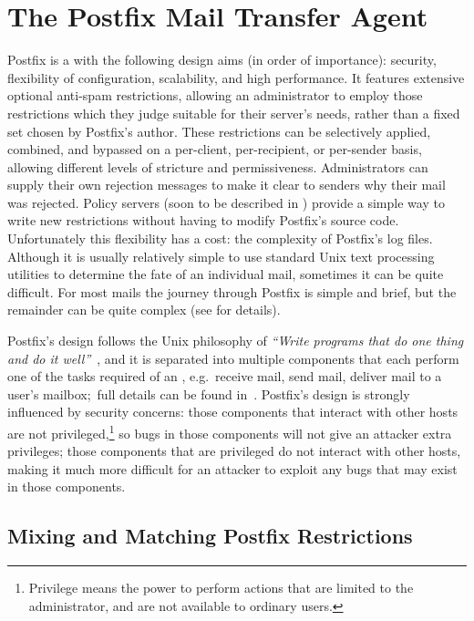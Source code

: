 \section{The Postfix Mail Transfer Agent}

\label{postfix background}

Postfix is a  with the following design aims (in order of
importance): security, flexibility of configuration, scalability, and high
performance.  It features extensive optional anti-spam restrictions,
allowing an administrator to employ those restrictions which they judge
suitable for their server's needs, rather than a fixed set chosen by
Postfix's author.  These restrictions can be selectively applied, combined,
and bypassed on a per-client, per-recipient, or per-sender basis, allowing
different levels of stricture and permissiveness.  Administrators can
supply their own rejection messages to make it clear to senders why their
mail was rejected.  Policy servers (soon to be described in
) provide a simple way to write new restrictions
without having to modify Postfix's source code.  Unfortunately this
flexibility has a cost: the complexity of Postfix's log files.  Although it
is usually relatively simple to use standard Unix text processing utilities
to determine the fate of an individual mail, sometimes it can be quite
difficult.  For most mails the journey through Postfix is simple and brief,
but the remainder can be quite complex (see  for
details).

Postfix's design follows the Unix philosophy of \textit{``Write programs
that do one thing and do it well''\/}~\cite{unix-philosophy}, and it is
separated into multiple components that each perform one of the tasks
required of an , e.g.\ receive mail, send mail, deliver mail
to a user's mailbox;\ full details can be found in~\cite{postfix-overview}.
Postfix's design is strongly influenced by security concerns: those
components that interact with other hosts are not
privileged,\footnote{Privilege means the power to perform actions that are
limited to the administrator, and are not available to ordinary users.} so
bugs in those components will not give an attacker extra privileges; those
components that are privileged do not interact with other hosts, making it
much more difficult for an attacker to exploit any bugs that may exist in
those components.

\subsection{Mixing and Matching Postfix Restrictions}

